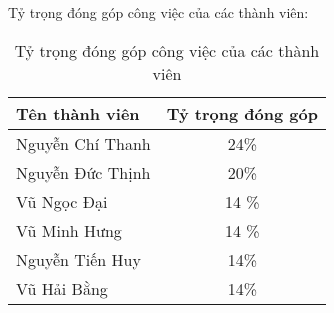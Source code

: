 Tỷ trọng đóng góp công việc của các thành viên:

\begin{table*}[h!]
    \centering
    \begin{tabular}{|l|c|}
        \hline
        Tên thành viên & Tỷ trọng đóng góp \\
        \hline
        Nguyễn Chí Thanh & 24\% \\
        \hline
        Nguyễn Đức Thịnh & 20\%  \\
        \hline
        Vũ Ngọc Đại & 14 \% \\
        \hline
        Vũ Minh Hưng & 14 \% \\
        \hline
        Nguyễn Tiến Huy & 14\% \\
        \hline
        Vũ Hải Bằng & 14\% \\
        \hline 
    \end{tabular}
    \caption*{Tỷ trọng đóng góp công việc của các thành viên}
\end{table*}